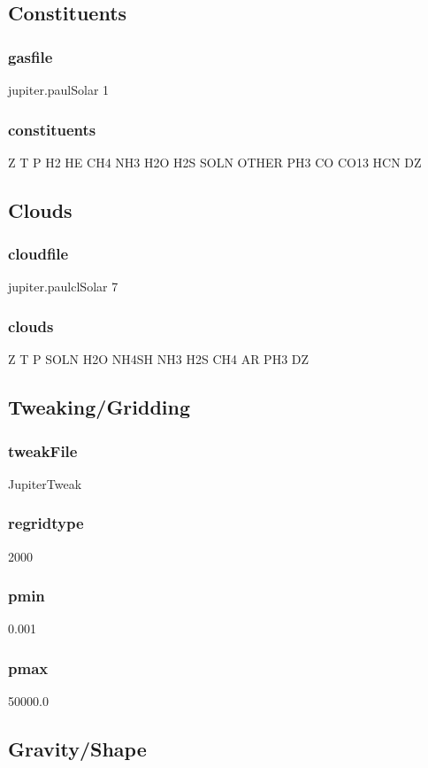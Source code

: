 \documentclass[11pt]{article}
\begin{document}
\subsection{Constituents}
\subsubsection{gasfile} 
jupiter.paulSolar 1

\subsubsection{constituents} 
Z T P H2 HE CH4 NH3 H2O H2S SOLN OTHER PH3 CO CO13 HCN DZ

\subsection{Clouds}
\subsubsection{cloudfile}
jupiter.paulclSolar 7

\subsubsection{clouds}
Z T P SOLN H2O NH4SH NH3 H2S CH4 AR PH3 DZ

\subsection{Tweaking/Gridding}
\subsubsection{tweakFile}
JupiterTweak

\subsubsection{regridtype}
2000

\subsubsection{pmin}
0.001

\subsubsection{pmax}
50000.0

\subsection{Gravity/Shape}
\end{document}
